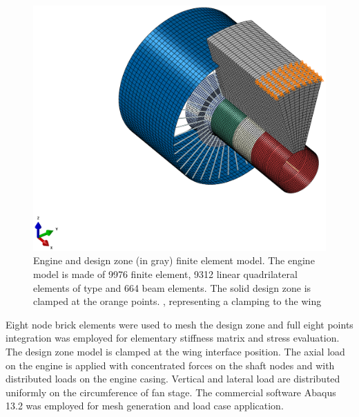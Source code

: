\begin{figure}[hbt!]
\centering
\includegraphics[width=1\textwidth]{images/Ch1/FEM_intro.eps}
\caption{Engine and design zone (in gray) finite element model. The engine model is made of 9976 finite element, 9312 linear quadrilateral elements of type and 664 beam elements. The solid design zone is clamped at the orange points.   \label{f.1}, representing a clamping to the wing}
\end{figure}
Eight node brick elements were used to mesh the design zone and full eight points integration was employed for elementary stiffness matrix and stress evaluation. The design zone model is clamped at the wing interface position. The axial load on the engine is applied with concentrated forces on the shaft nodes and with distributed loads on the engine casing. Vertical and lateral load are distributed uniformly on the circumference of fan stage. %
The commercial software Abaqus 13.2 was employed for mesh generation and load case application.
